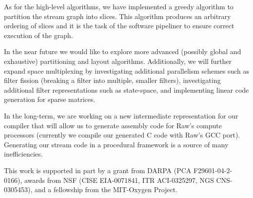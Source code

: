 \documentclass{csailabstractbook}
\begin{document}
As for the high-level algorithms, we have implemented a greedy
algorithm to partition the stream graph into slices.  This algorithm
produces an arbitrary ordering of slices and it is the
task of the software pipeliner to ensure correct execution of the
graph. 

In the near future we would like to explore more advanced (possibly global
and exhaustive) partitioning and layout algorithms.  Additionally, we
will further expand space multiplexing by investigating
additional parallelism schemes such as filter fission (breaking a
filter into multiple, smaller filters), investigating additional filter
representations such as state-space, and implementing linear code
generation for sparse matrices.  

In the long-term, we are working on a new intermediate representation
for our compiler that will allow us to generate assembly code for
Raw's compute processors (currently we compile our generated C code
with Raw's GCC port).  Generating our stream code in a procedural
framework is a source of many inefficiencies.  

This work is supported in part by a grant from DARPA (PCA
F29601-04-2-0166), awards from NSF (CISE EIA-0071841, ITR ACI-0325297,
NGS CNS-0305453), and a fellowship from the MIT-Oxygen Project.


\end{document}
